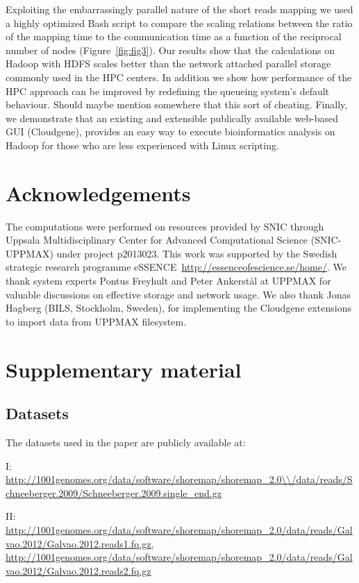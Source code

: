 \documentclass[11pt, oneside]{article}   	%
\newcommand{\COMMENT}[1]{{\color{red} #1 }}
\begin{document}
Exploiting the embarrassingly parallel nature of the short reads mapping we used a highly optimized Bash script to compare the scaling relations between the ratio of the mapping time to the communication time as a function of the reciprocal number of nodes (Figure~\ref{fig:fig3}). 
Our results show that the calculations on Hadoop with HDFS scales better than the network attached parallel storage commonly used in the HPC centers.
In addition we show how performance of the HPC approach can be improved by redefining the queueing system's default behaviour. \COMMENT{Should maybe mention somewhere that this sort of cheating.} Finally, we demonstrate that an existing and extensible publically available web-based GUI (Cloudgene), provides an easy way to execute bioinformatics analysis on Hadoop for those who are less experienced with Linux scripting.



\section{Acknowledgements}
The computations were performed on resources provided by SNIC through Uppsala Multidisciplinary Center for Advanced Computational Science (SNIC-UPPMAX) under project p2013023. This work was supported by the Swedish strategic research programme eSSENCE~\url{http://essenceofescience.se/home/}.
We thank system experts Pontus Freyhult and Peter Ankerst{\aa}l at UPPMAX for valuable discussions on effective storage and network usage. We also thank Jonas Hagberg (BILS, Stockholm, Sweden), for implementing the Cloudgene extensions to import data from UPPMAX filesystem.



\section{Supplementary material}

\subsection{Datasets}

The datasets used in the paper are publicly available at:

I: \url{http://1001genomes.org/data/software/shoremap/shoremap\_2.0\\/data/reads/Schneeberger.2009/Schneeberger.2009.single\_end.gz}

II: \url{http://1001genomes.org/data/software/shoremap/shoremap\_2.0/data/reads/Galvao.2012/Galvao.2012.reads1.fq.gz, http://1001genomes.org/data/software/shoremap/shoremap\_2.0/data/reads/Galvao.2012/Galvao.2012.reads2.fq.gz}	
\end{document}
